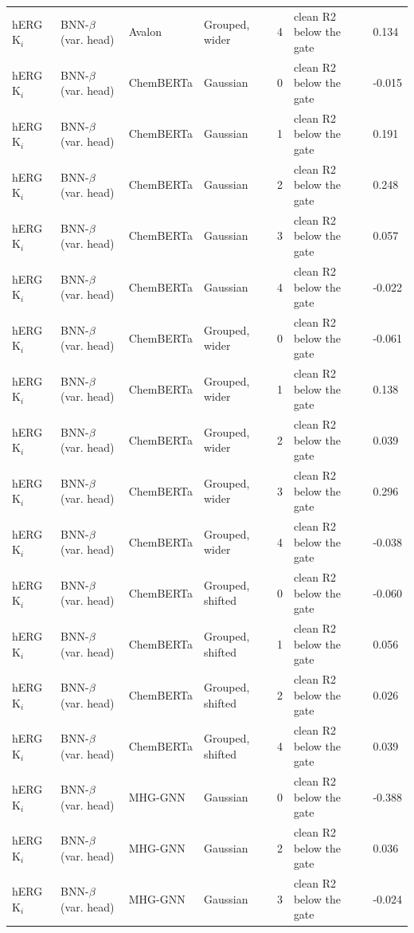{\begin{longtable}{llllcll}
hERG K$_i$ & BNN-$\beta$ (var. head) & Avalon & Grouped, wider & 4 & clean R2 below the gate & 0.134 \\
hERG K$_i$ & BNN-$\beta$ (var. head) & ChemBERTa & Gaussian & 0 & clean R2 below the gate & -0.015 \\
hERG K$_i$ & BNN-$\beta$ (var. head) & ChemBERTa & Gaussian & 1 & clean R2 below the gate & 0.191 \\
hERG K$_i$ & BNN-$\beta$ (var. head) & ChemBERTa & Gaussian & 2 & clean R2 below the gate & 0.248 \\
hERG K$_i$ & BNN-$\beta$ (var. head) & ChemBERTa & Gaussian & 3 & clean R2 below the gate & 0.057 \\
hERG K$_i$ & BNN-$\beta$ (var. head) & ChemBERTa & Gaussian & 4 & clean R2 below the gate & -0.022 \\
hERG K$_i$ & BNN-$\beta$ (var. head) & ChemBERTa & Grouped, wider & 0 & clean R2 below the gate & -0.061 \\
hERG K$_i$ & BNN-$\beta$ (var. head) & ChemBERTa & Grouped, wider & 1 & clean R2 below the gate & 0.138 \\
hERG K$_i$ & BNN-$\beta$ (var. head) & ChemBERTa & Grouped, wider & 2 & clean R2 below the gate & 0.039 \\
hERG K$_i$ & BNN-$\beta$ (var. head) & ChemBERTa & Grouped, wider & 3 & clean R2 below the gate & 0.296 \\
hERG K$_i$ & BNN-$\beta$ (var. head) & ChemBERTa & Grouped, wider & 4 & clean R2 below the gate & -0.038 \\
hERG K$_i$ & BNN-$\beta$ (var. head) & ChemBERTa & Grouped, shifted & 0 & clean R2 below the gate & -0.060 \\
hERG K$_i$ & BNN-$\beta$ (var. head) & ChemBERTa & Grouped, shifted & 1 & clean R2 below the gate & 0.056 \\
hERG K$_i$ & BNN-$\beta$ (var. head) & ChemBERTa & Grouped, shifted & 2 & clean R2 below the gate & 0.026 \\
hERG K$_i$ & BNN-$\beta$ (var. head) & ChemBERTa & Grouped, shifted & 4 & clean R2 below the gate & 0.039 \\
hERG K$_i$ & BNN-$\beta$ (var. head) & MHG-GNN & Gaussian & 0 & clean R2 below the gate & -0.388 \\
hERG K$_i$ & BNN-$\beta$ (var. head) & MHG-GNN & Gaussian & 2 & clean R2 below the gate & 0.036 \\
hERG K$_i$ & BNN-$\beta$ (var. head) & MHG-GNN & Gaussian & 3 & clean R2 below the gate & -0.024 \\

\end{longtable}}
